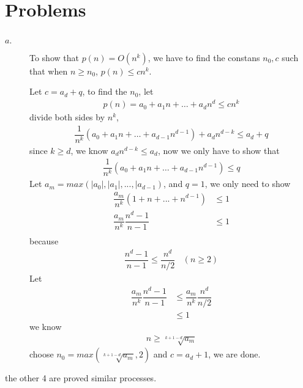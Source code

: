 \documentclass[paper=a4, fontsize=11pt,oneside]{book} %
\numberwithin{equation}{section} %
\numberwithin{figure}{section} %
\numberwithin{table}{section} %
\begin{document}
	\section{Problems}
		\subsection{}
			\begin{description}
				\item[$a.$] To show that $p(n) = O(n^k)$, we have to find the constans $n_0,c$ such that when $n \geq n_0$, $p(n) \leq cn^k$.
				
				Let $c = a_d + q$, to find the $n_0$, let
				\begin{align*}
				p(n) = a_0 + a_1n + \dots + a_dn^d \leq cn^k
				\end{align*}
				divide both sides by $n^k$,
				\begin{align*}
				\dfrac{1}{n^k}(a_0 + a_1n + \dots + a_{d-1}n^{d-1}) +  a_dn^{d-k} \leq a_d + q				
				\end{align*}
				since $k \geq d$, we know $a_{d}n^{d-k} \leq a_d$, now we only have to show that
				\begin{align*}
				\dfrac{1}{n^k}(a_0 + a_1n + \dots + a_{d-1}n^{d-1}) \leq q			
				\end{align*}
				Let $a_m = max(|a_0|, |a_1|, ... , |a_{d-1})$, and $q= 1$, we only need to show
				\begin{align*}
					\dfrac{a_m}{n^k}(1 + n + ... + n^{d-1}) &\leq 1  \\
						\dfrac{a_m}{n^k}\dfrac{n^d - 1}{n - 1}&\leq 1 \\
				\end{align*}
				because
				\begin{align*}
				\dfrac{n^d-1}{n-1} \leq \dfrac{n^d}{n/2} \ \ \ \ (n \geq 2 )
				\end{align*}
				Let
				\begin{align*}
				   	\dfrac{a_m}{n^k}\dfrac{n^d - 1}{n - 1}&\leq \dfrac{a_m}{n^k} \dfrac{n^d}{n/2} \\
				   	&\leq 1 
				\end{align*}
				we know 
				\begin{align*}
				n \geq \sqrt[k+1-d]{a_m}
				\end{align*}
				choose $n_0 = max(\sqrt[k+1-d]{a_m}, 2)$ and $c = a_d + 1$, we are done.
			\end{description}
			the other 4 are proved similar processes.
			
\end{document}
